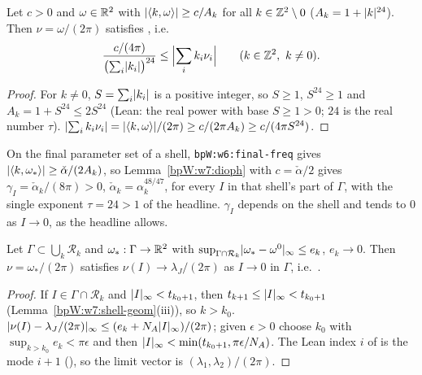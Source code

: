 \begin{lemma}[From the $l=0$ condition to \Lean{KAM.IsDiophantine}]\label{bpW:w7:dioph}
Let $c>0$ and $\omega\in\mathbb{R}^2$ with $\lvert \langle k,\omega\rangle\rvert\ge c/A_k$ for all $k\in\mathbb{Z}^2\setminus0$
($A_k=1+\lvert k\rvert^{24}$). Then $\nu=\omega/(2\pi)$ satisfies , i.e.
\[\frac{c/(4\pi)}{\bigl(\sum_i\abs{k_i}\bigr)^{24}}\le\Bigl|\sum_ik_i\nu_i\Bigr|\qquad(k\in\Z^2,\ k\ne0).\]
\end{lemma}
\begin{proof}
\label{stepW:w7:dioph-base}
For $k\ne0$, $S=\sum_i\lvert k_i\rvert$ is a positive integer, so $S\ge1$, $S^{24}\ge1$ and $A_k=1+S^{24}\le2S^{24}$ (Lean:
the real power  with base $S\ge1>0$; $24$ is the real number $\tau$).
\label{stepW:w7:dioph-scale}
$\lvert \sum_ik_i\nu_i\rvert=\lvert \langle k,\omega\rangle\rvert/(2\pi)\ge c/(2\pi A_k)\ge c/(4\pi S^{24})$.
\end{proof}

\begin{remark}\label{bpW:w7:dioph-use}
On the final parameter set of a shell, \texttt{bpW:w6:final-freq} gives $\lvert \langle k,\omega_*\rangle\rvert\ge\check\alpha/(2A_k)$,
so Lemma~\ref{bpW:w7:dioph} with $c=\check\alpha/2$ gives $\gamma_I=\check\alpha_k/(8\pi)>0$, $\check\alpha_k=
\alpha_k^{48/47}$, for every $I$ in that shell's part of $\Gamma$, with the single exponent $\tau=24>1$ of the headline.
$\gamma_I$ depends on the shell and tends to $0$ as $I\to0$, as the headline allows.
\end{remark}

\begin{lemma}\label{bpW:w7:limit}
Let $\Gamma\subset\bigcup_k\mathcal R_k$ and $\omega_*:\Gamma\to\mathbb{R}^2$ with
$\sup_{\Gamma\cap\mathcal R_k}\lvert \omega_*-\omega^0\rvert_\infty\le e_k$, $e_k\to0$. Then $\nu=\omega_*/(2\pi)$
satisfies $\nu(I)\to\lambda_J/(2\pi)$ as $I\to0$ in $\Gamma$, i.e.\ .
\end{lemma}
\begin{proof}
\label{stepW:w7:lim-index}
If $I\in\Gamma\cap\mathcal R_k$ and $\lvert I\rvert_\infty<t_{k_0+1}$, then $t_{k+1}\le\lvert I\rvert_\infty<t_{k_0+1}$
(Lemma~\ref{bpW:w7:shell-geom}(iii)), so $k>k_0$.
\label{stepW:w7:lim-est}
$\lvert \nu(I)-\lambda_J/(2\pi)\rvert_\infty\le(e_k+N_A\lvert I\rvert_\infty)/(2\pi)$; given $\epsilon>0$ choose $k_0$ with
$\sup_{k>k_0}e_k<\pi\epsilon$ and then $\lvert I\rvert_\infty<\min(t_{k_0+1},\pi\epsilon/N_A)$. The Lean index $i$ of
 is the mode $i+1$ (), so the limit vector is $(\lambda_1,\lambda_2)/(2\pi)$.
\end{proof}

